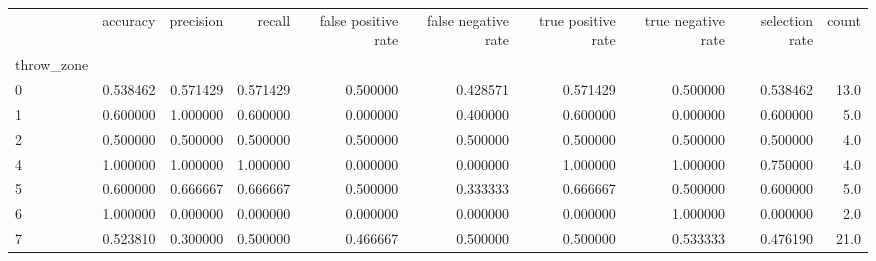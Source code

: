 \begin{tabular}{lrrrrrrrrr}
\toprule
{} &  accuracy &  precision &    recall &  false positive rate &  false negative rate &  true positive rate &  true negative rate &  selection rate &  count \\
throw\_zone &           &            &           &                      &                      &                     &                     &                 &        \\
\midrule
0          &  0.538462 &   0.571429 &  0.571429 &             0.500000 &             0.428571 &            0.571429 &            0.500000 &        0.538462 &   13.0 \\
1          &  0.600000 &   1.000000 &  0.600000 &             0.000000 &             0.400000 &            0.600000 &            0.000000 &        0.600000 &    5.0 \\
2          &  0.500000 &   0.500000 &  0.500000 &             0.500000 &             0.500000 &            0.500000 &            0.500000 &        0.500000 &    4.0 \\
4          &  1.000000 &   1.000000 &  1.000000 &             0.000000 &             0.000000 &            1.000000 &            1.000000 &        0.750000 &    4.0 \\
5          &  0.600000 &   0.666667 &  0.666667 &             0.500000 &             0.333333 &            0.666667 &            0.500000 &        0.600000 &    5.0 \\
6          &  1.000000 &   0.000000 &  0.000000 &             0.000000 &             0.000000 &            0.000000 &            1.000000 &        0.000000 &    2.0 \\
7          &  0.523810 &   0.300000 &  0.500000 &             0.466667 &             0.500000 &            0.500000 &            0.533333 &        0.476190 &   21.0 \\
\bottomrule
\end{tabular}
